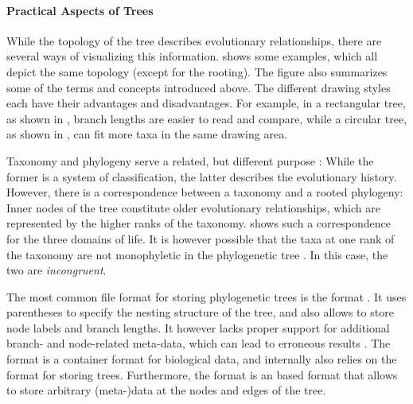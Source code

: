 \paragraph{Practical Aspects of Trees}
\label{ch:Foundations:sec:TreeOfLife:sub:PhylogeneticTrees:par:PracticalAspects}

While the topology of the tree describes evolutionary relationships,
there are several ways of visualizing this information.
 shows some examples, which all depict the same topology (except for the rooting).
The figure also summarizes some of the terms and concepts introduced above.
The different drawing styles each have their advantages and disadvantages.
For example, in a rectangular tree, as shown in ,
branch lengths are easier to read and compare,
while a circular tree, as shown in , can fit more taxa in the same drawing area.

Taxonomy and phylogeny serve a related, but different purpose \cite{Hinchliff2015}:
While the former is a system of classification,
the latter describes the evolutionary history.
However, there is a correspondence between a taxonomy and a rooted phylogeny:
Inner nodes of the tree constitute older evolutionary relationships,
which are represented by the higher ranks of the taxonomy.
 shows such a correspondence for the three domains of life.
It is however possible that the taxa at one rank of the taxonomy are not monophyletic in the phylogenetic tree \cite{Hinchliff2015}.
In this case, the two are \emph{incongruent}.


The most common file format for storing phylogenetic trees is the  format \cite{Archie1986}.
It uses parentheses to specify the nesting structure of the tree,
and also allows to store node labels and branch lengths.
It however lacks proper support for additional branch- and node-related meta-data,
which can lead to erroneous results \cite{Czech2017-tree-viewers}.
The  format \cite{Maddison1997} is a container format for biological data,
and internally also relies on the  format for storing trees.
Furthermore, the  format \cite{Han2009} is an  based format
that allows to store arbitrary (meta-)data at the nodes and edges of the tree.

